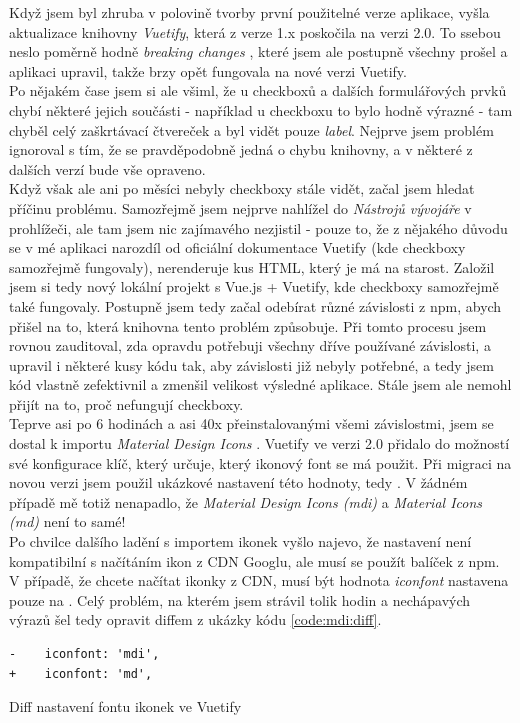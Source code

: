 Když jsem byl zhruba v polovině tvorby první použitelné verze aplikace, vyšla aktualizace knihovny \emph{Vuetify}, která z verze 1.x poskočila na verzi 2.0. To ssebou neslo poměrně hodně \emph{breaking changes} \cite{vuetify-2-upgrade}, které jsem ale postupně všechny prošel a aplikaci upravil, takže brzy opět fungovala na nové verzi Vuetify.\\
Po nějakém čase jsem si ale všiml, že u checkboxů a dalších formulářových prvků chybí některé jejich součásti - například u checkboxu to bylo hodně výrazné - tam chyběl celý zaškrtávací čtvereček a byl vidět pouze \emph{label}. Nejprve jsem problém ignoroval s tím, že se pravděpodobně jedná o chybu knihovny, a v některé z dalších verzí bude vše opraveno.\\
Když však ale ani po měsíci nebyly checkboxy stále vidět, začal jsem hledat příčinu problému. Samozřejmě jsem nejprve nahlížel do \emph{Nástrojů vývojáře} v prohlížeči, ale tam jsem nic zajímavého nezjistil - pouze to, že z nějakého důvodu se v mé aplikaci narozdíl od oficiální dokumentace Vuetify \cite{vuetify-doc-checkbox} (kde checkboxy samozřejmě fungovaly), nerenderuje kus HTML, který je má na starost. Založil jsem si tedy nový lokální projekt s Vue.js + Vuetify, kde checkboxy samozřejmě také fungovaly. Postupně jsem tedy začal odebírat různé závislosti z npm, abych přišel na to, která knihovna tento problém způsobuje. Při tomto procesu jsem rovnou zauditoval, zda opravdu potřebuji všechny dříve používané závislosti, a upravil i některé kusy kódu tak, aby závislosti již nebyly potřebné, a tedy jsem kód vlastně zefektivnil a zmenšil velikost výsledné aplikace. Stále jsem ale nemohl přijít na to, proč nefungují checkboxy.\\
Teprve asi po 6 hodinách a asi 40x přeinstalovanými všemi závislostmi, jsem se dostal k importu \emph{Material Design Icons} \cite{mdi}. Vuetify ve verzi 2.0 přidalo do možností své konfigurace klíč, který určuje, který ikonový font se má použit. Při migraci na novou verzi jsem použil ukázkové nastavení této hodnoty, tedy . V žádném případě mě totiž nenapadlo, že \emph{Material Design Icons (mdi)} a \emph{Material Icons (md)} není to samé!\\
Po chvilce dalšího ladění s importem ikonek vyšlo najevo, že nastavení  není kompatibilní s načítáním ikon z CDN Googlu, ale musí se použít balíček z npm. V případě, že chcete načítat ikonky z CDN, musí být hodnota \emph{iconfont} nastavena pouze na . Celý problém, na kterém jsem strávil tolik hodin a nechápavých výrazů šel tedy opravit diffem z ukázky kódu \ref{code:mdi:diff}.

\begin{listing}[h]
\begin{verbatim}
-    iconfont: 'mdi',
+    iconfont: 'md',
\end{verbatim}
\caption{Diff nastavení fontu ikonek ve Vuetify} \label{code:mdi:diff}
\end{listing}

